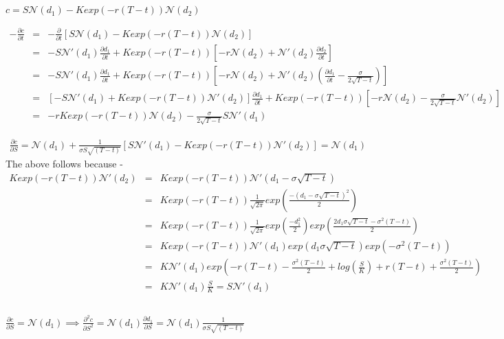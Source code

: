 \documentclass[11pt, fleqn]{article}
\begin{document}
\subsection{}
$c = S\mathcal{N}(d_1) - Kexp(-r(T-t))\mathcal{N}(d_2)$

\begin{eqnarray*}
-\frac{\partial c}{\partial t} &=& -\frac{\partial}{\partial t}[S\mathcal{N}(d_1) - Kexp(-r(T-t))\mathcal{N}(d_2)] \\
&=& -S\mathcal{N}'(d_1)\frac{\partial d_1}{\partial t} + Kexp(-r(T-t))[-r\mathcal{N}(d_2) + \mathcal{N}'(d_2)\frac{\partial d_2}{\partial t}]\\
&=& -S\mathcal{N}'(d_1)\frac{\partial d_1}{\partial t} + Kexp(-r(T-t))[-r\mathcal{N}(d_2) + \mathcal{N}'(d_2)(\frac{\partial d_1}{\partial t} - \frac{\sigma}{2\sqrt{T-t}})]\\
&=& [-S\mathcal{N}'(d_1) + Kexp(-r(T-t))\mathcal{N}'(d_2)]\frac{\partial d_1}{\partial t} + Kexp(-r(T-t))[-r\mathcal{N}(d_2) - \frac{\sigma}{2\sqrt{T-t}}\mathcal{N}'(d_2)]\\
&=& -rKexp(-r(T-t))\mathcal{N}(d_2) - \frac{\sigma}{2\sqrt{T-t}}S\mathcal{N}'(d_1)
\end{eqnarray*}

\begin{eqnarray*}
\frac{\partial c}{\partial S} = \mathcal{N}(d_1) + \frac{1}{\sigma S \sqrt{(T-t)}}[S\mathcal{N}'(d_1) - Kexp(-r(T-t))\mathcal{N}'(d_2)] = \mathcal{N}(d_1)
\end{eqnarray*}
The above follows because -
\begin{eqnarray*}
Kexp(-r(T-t))\mathcal{N}'(d_2) &=& Kexp(-r(T-t))\mathcal{N}'(d_1 - \sigma\sqrt{T-t})\\
&=& Kexp(-r(T-t))\frac{1}{\sqrt{2\pi}}exp(\frac{-(d_1 - \sigma\sqrt{T-t})^2}{2})\\
&=& Kexp(-r(T-t))\frac{1}{\sqrt{2\pi}}exp(\frac{-d_1^2}{2})exp(\frac{2d_1\sigma\sqrt{T-t} - \sigma^2(T-t)}{2})\\
&=& Kexp(-r(T-t))\mathcal{N}'(d_1)exp(d_1\sigma\sqrt{T-t})exp(-\sigma^2(T-t))\\
&=& K\mathcal{N}'(d_1)exp(-r(T-t)-\frac{\sigma^2(T-t)}{2} + log(\frac{S}{K}) + r(T-t) + \frac{\sigma^2(T-t)}{2})\\
&=& K\mathcal{N}'(d_1)\frac{S}{K} = S\mathcal{N}'(d_1)
\end{eqnarray*}

\subsection{}
$
\frac{\partial c}{\partial S} = \mathcal{N}(d_1)
\implies \frac{\partial^2 c}{\partial S^2} = \mathcal{N}(d_1)\frac{\partial d_1}{\partial S} = \mathcal{N}(d_1)\frac{1}{\sigma S \sqrt{(T-t)}}
$
\end{document}

